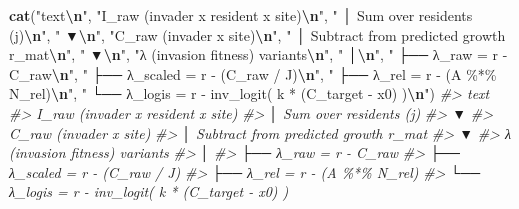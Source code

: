 \documentclass[
]{article}
\newenvironment{Shaded}{\begin{snugshade}}{\end{snugshade}}
\newcommand{\CommentTok}[1]{\textcolor[rgb]{0.56,0.35,0.01}{\textit{#1}}}
\newcommand{\FunctionTok}[1]{\textcolor[rgb]{0.13,0.29,0.53}{\textbf{#1}}}
\newcommand{\NormalTok}[1]{#1}
\newcommand{\SpecialCharTok}[1]{\textcolor[rgb]{0.81,0.36,0.00}{\textbf{#1}}}
\newcommand{\StringTok}[1]{\textcolor[rgb]{0.31,0.60,0.02}{#1}}
\begin{document}
\begin{Shaded}
\begin{Highlighting}[]
\FunctionTok{cat}\NormalTok{(}\StringTok{"\textasciigrave{}\textasciigrave{}\textasciigrave{}text}\SpecialCharTok{\textbackslash{}n}\StringTok{"}\NormalTok{,}
\StringTok{"I\_raw  (invader x resident x site)}\SpecialCharTok{\textbackslash{}n}\StringTok{"}\NormalTok{,}
\StringTok{"   │  Sum over residents (j)}\SpecialCharTok{\textbackslash{}n}\StringTok{"}\NormalTok{,}
\StringTok{"   ▼}\SpecialCharTok{\textbackslash{}n}\StringTok{"}\NormalTok{,}
\StringTok{"C\_raw  (invader x site)}\SpecialCharTok{\textbackslash{}n}\StringTok{"}\NormalTok{,}
\StringTok{"   │  Subtract from predicted growth r\_mat}\SpecialCharTok{\textbackslash{}n}\StringTok{"}\NormalTok{,}
\StringTok{"   ▼}\SpecialCharTok{\textbackslash{}n}\StringTok{"}\NormalTok{,}
\StringTok{"λ (invasion fitness) variants}\SpecialCharTok{\textbackslash{}n}\StringTok{"}\NormalTok{,}
\StringTok{"   │}\SpecialCharTok{\textbackslash{}n}\StringTok{"}\NormalTok{,}
\StringTok{"   ├── λ\_raw       = r {-} C\_raw}\SpecialCharTok{\textbackslash{}n}\StringTok{"}\NormalTok{,}
\StringTok{"   ├── λ\_scaled    = r {-} (C\_raw / J)}\SpecialCharTok{\textbackslash{}n}\StringTok{"}\NormalTok{,}
\StringTok{"   ├── λ\_rel       = r {-} (A \%*\% N\_rel)}\SpecialCharTok{\textbackslash{}n}\StringTok{"}\NormalTok{,}
\StringTok{"   └── λ\_logis     = r {-} inv\_logit( k * (C\_target {-} x0) )}\SpecialCharTok{\textbackslash{}n}\StringTok{"}\NormalTok{)}
\CommentTok{\#\textgreater{} \textasciigrave{}\textasciigrave{}\textasciigrave{}text}
\CommentTok{\#\textgreater{}  I\_raw  (invader x resident x site)}
\CommentTok{\#\textgreater{}     │  Sum over residents (j)}
\CommentTok{\#\textgreater{}     ▼}
\CommentTok{\#\textgreater{}  C\_raw  (invader x site)}
\CommentTok{\#\textgreater{}     │  Subtract from predicted growth r\_mat}
\CommentTok{\#\textgreater{}     ▼}
\CommentTok{\#\textgreater{}  λ (invasion fitness) variants}
\CommentTok{\#\textgreater{}     │}
\CommentTok{\#\textgreater{}     ├── λ\_raw       = r {-} C\_raw}
\CommentTok{\#\textgreater{}     ├── λ\_scaled    = r {-} (C\_raw / J)}
\CommentTok{\#\textgreater{}     ├── λ\_rel       = r {-} (A \%*\% N\_rel)}
\CommentTok{\#\textgreater{}     └── λ\_logis     = r {-} inv\_logit( k * (C\_target {-} x0) )}
\end{Highlighting}
\end{Shaded}
\end{document}
